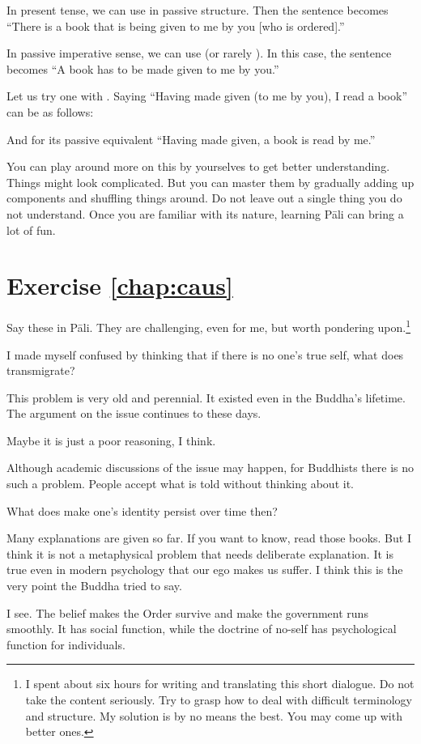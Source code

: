 In present tense, we can use  in passive structure. Then the sentence becomes ``There is a book that is being given to me by you [who is ordered].''


In passive imperative sense, we can use  (or rarely ). In this case, the sentence becomes ``A book has to be made given to me by you.''


Let us try one with . Saying ``Having made given (to me by you), I read a book'' can be as follows:


And for its passive equivalent ``Having made given, a book is read by me.''


You can play around more on this by yourselves to get better understanding. Things might look complicated. But you can master them by gradually adding up components and shuffling things around. Do not leave out a single thing you do not understand. Once you are familiar with its nature, learning P\=ali can bring a lot of fun.

\enlargethispage{3\baselineskip}
\section*{Exercise \ref{chap:caus}}
Say these in P\=ali. They are challenging, even for me, but worth pondering upon.\footnote{I spent about six hours for writing and translating this short dialogue. Do not take the content seriously. Try to grasp how to deal with difficult terminology and structure. My solution is by no means the best. You may come up with better ones.}
\begin{compactenum}
\item I made myself confused by thinking that if there is no one's true self, what does transmigrate?
\item This problem is very old and perennial. It existed even in the Buddha's lifetime. The argument on the issue continues to these days.
\item Maybe it is just a poor reasoning, I think.
\item Although academic discussions of the issue may happen, for Buddhists there is no such a problem. People accept what is told without thinking about it.
\item What does make one's identity persist over time then?
\item Many explanations are given so far. If you want to know, read those books. But I think it is not a metaphysical problem that needs deliberate explanation. It is true even in modern psychology that our ego makes us suffer. I think this is the very point the Buddha tried to say.
\item I see. The belief makes the Order survive and make the government runs smoothly. It has social function, while the doctrine of no-self has psychological function for individuals.
\end{compactenum}
